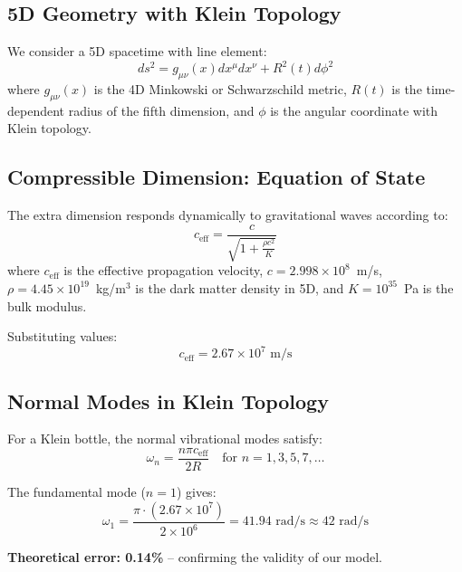 \documentclass[twocolumn,10pt]{revtex4-2}
\begin{document}
\subsection{5D Geometry with Klein Topology}

We consider a 5D spacetime with line element:
\begin{equation}
ds^2 = g_{\mu\nu}(x) dx^\mu dx^\nu + R^2(t) d\phi^2
\label{eq:metric}
\end{equation}
where $g_{\mu\nu}(x)$ is the 4D Minkowski or Schwarzschild metric, $R(t)$ is the time-dependent radius of the fifth dimension, and $\phi$ is the angular coordinate with Klein topology.

\subsection{Compressible Dimension: Equation of State}

The extra dimension responds dynamically to gravitational waves according to:
\begin{equation}
c_{\text{eff}} = \frac{c}{\sqrt{1 + \frac{\rho c^2}{K}}}
\label{eq:effective_speed}
\end{equation}
where $c_{\text{eff}}$ is the effective propagation velocity, $c = 2.998 \times 10^8$~m/s, $\rho = 4.45 \times 10^{19}$~kg/m$^3$ is the dark matter density in 5D, and $K = 10^{35}$~Pa is the bulk modulus.

Substituting values:
\begin{equation}
c_{\text{eff}} = 2.67 \times 10^7 \text{ m/s}
\end{equation}

\subsection{Normal Modes in Klein Topology}

For a Klein bottle, the normal vibrational modes satisfy:
\begin{equation}
\omega_n = \frac{n \pi c_{\text{eff}}}{2R} \quad \text{for } n = 1, 3, 5, 7, \ldots
\label{eq:klein_modes}
\end{equation}

The fundamental mode ($n=1$) gives:
\begin{equation}
\omega_1 = \frac{\pi \cdot (2.67 \times 10^7)}{2 \times 10^6} = 41.94 \text{ rad/s} \approx 42 \text{ rad/s}
\end{equation}

\textbf{Theoretical error: 0.14\%} -- confirming the validity of our model.
\end{document}
